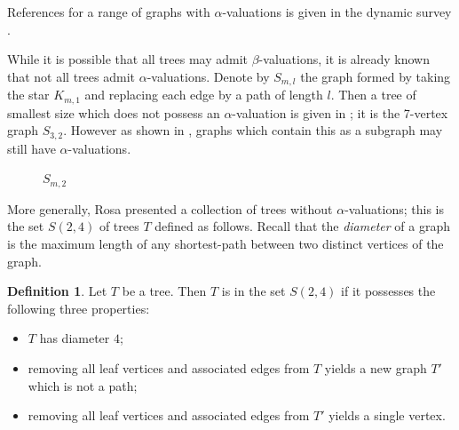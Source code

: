 \documentclass[12pt, a4paper]{article}
\theoremstyle{definition}
\newtheorem{definition}[theorem]{Definition}
\begin{document}
References for a range of graphs with $\alpha$-valuations is given in the dynamic survey \cite{Gal}.

While it is possible that all trees may admit $\beta$-valuations, it is already known that not all trees admit $\alpha$-valuations. Denote by $S_{m,l}$ the graph formed by taking the star $K_{m,1}$ and replacing each edge by a path of length $l$.  Then a tree of smallest size which does not possess an $\alpha$-valuation is given in \cite{Rosa}; it is the 7-vertex graph $S_{3,2}$.  However as shown in \cite{Barrientos}, graphs which contain this as a subgraph may still have $\alpha$-valuations.  

\begin{figure}
    \centering
    \caption{$S_{m,2}$}
    \label{fig:S_{m,2}}
\end{figure}


More generally, Rosa presented a collection of trees without $\alpha$-valuations; this is the set $S(2,4)$ of trees $T$ defined as follows. Recall that the \emph{diameter} of a graph is the maximum length of any shortest-path between two distinct vertices of the graph.

\begin{definition}\label{def:S(2,4)}
Let $T$ be a tree.  Then $T$ is in the set $S(2,4)$ if it possesses the following three properties:
\begin{itemize}
\item $T$ has diameter $4$; 
\item removing all leaf vertices and associated edges from $T$ yields a new graph $T'$ which is not a path; 
\item removing all leaf vertices and associated edges from $T'$ yields a single vertex.  
\end{itemize}   
\end{definition}
\end{document}

